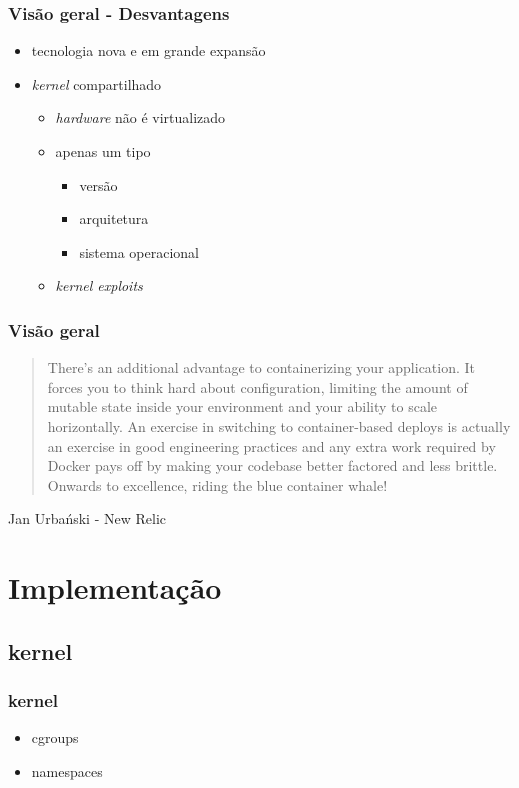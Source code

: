 \documentclass{beamer}
\begin{document}
\begin{frame}
    \frametitle{Visão geral - Desvantagens}
    \begin{itemize}
        \item tecnologia nova e em grande expansão
        \item \textit{kernel} compartilhado
        \begin{itemize}
            \item \textit{hardware} não é virtualizado
            \item apenas um tipo
            \begin{itemize}
                \item versão
                \item arquitetura
                \item sistema operacional
            \end{itemize}
            \item \textit{kernel exploits}
        \end{itemize}
    \end{itemize}
\end{frame}

\begin{frame}
    \frametitle{Visão geral}
    \begin{quote}
        There’s an additional advantage to containerizing your application. It
        forces you to think hard about configuration, limiting the amount of
        mutable state inside your environment and your ability to scale
        horizontally. An exercise in switching to container-based deploys is
        actually an exercise in good engineering practices and any extra work
        required by Docker pays off by making your codebase better factored and
        less brittle. Onwards to excellence, riding the blue container whale!
    \end{quote}
    Jan Urbański - New Relic
\end{frame}

\section{Implementação}

\subsection{kernel}

\begin{frame}
    \frametitle{kernel}
    \begin{itemize}
        \item cgroups
        \item namespaces
    \end{itemize}
\end{frame}
\end{document}

